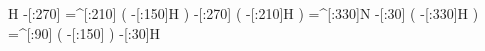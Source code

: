             H%
     -[:270]%
    =^[:210]%
               (
         -[:150]H%
               )
     -[:270]%
               (
         -[:210]H%
               )
    =^[:330]N%
      -[:30]%
               (
         -[:330]H%
               )
     =^[:90]%
               (
         -[:150]%
               )
      -[:30]H%